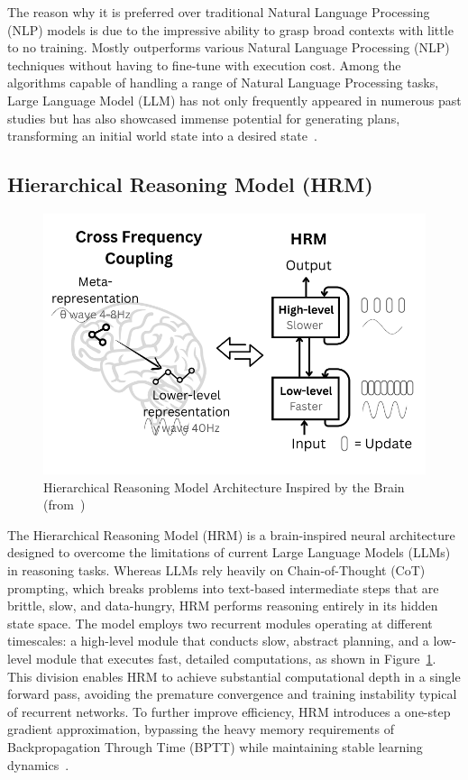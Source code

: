 \documentclass[12pt]{extarticle}
\begin{document}
The reason why it is preferred over traditional Natural Language Processing (NLP) models is due to
the impressive ability to grasp broad contexts with little to no training. Mostly outperforms various
Natural Language Processing (NLP) techniques without having to fine-tune with execution cost.
Among the algorithms capable of handling a range of Natural Language Processing tasks, Large
Language Model (LLM) has not only frequently appeared in numerous past studies but has also
showcased immense potential for generating plans, transforming an initial world state into a desired state~\cite{plangenllm}.

\subsection{Hierarchical Reasoning Model (HRM)}

\begin{figure}[htbp]
    \centering
    \includegraphics[width=0.5\linewidth]{images/hrm-arch.png}
    \caption{Hierarchical Reasoning Model Architecture Inspired by the Brain (from~\cite{hrm})}
    \label{fig:hrm-archictecture}
\end{figure}

The Hierarchical Reasoning Model (HRM) is a brain-inspired neural architecture designed to overcome the limitations of current Large Language Models (LLMs) in reasoning tasks. Whereas LLMs rely heavily on Chain-of-Thought (CoT) prompting, which breaks problems into text-based intermediate steps that are brittle, slow, and data-hungry, HRM performs reasoning entirely in its hidden state space. The model employs two recurrent modules operating at different timescales: a high-level module that conducts slow, abstract planning, and a low-level module that executes fast, detailed computations, as shown in Figure~\ref{fig:hrm-archictecture}. This division enables HRM to achieve substantial computational depth in a single forward pass, avoiding the premature convergence and training instability typical of recurrent networks. To further improve efficiency, HRM introduces a one-step gradient approximation, bypassing the heavy memory requirements of Backpropagation Through Time (BPTT) while maintaining stable learning dynamics~\cite{hrm}.
\end{document}
